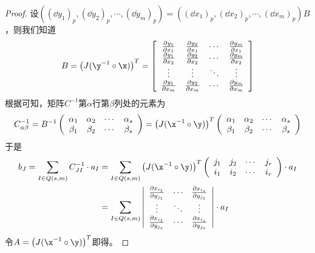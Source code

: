 \begin{proof}
	设$\left( (\dd y_{1})_{p},(\dd y_{2})_{p},\cdots,(\dd y_{m})_{p} \right)=\left( (\dd x_{1})_{p},(\dd x_{2})_{p},\cdots,(\dd x_{m})_{p} \right)B$，则我们知道
	\[
		B=\left( J(\y^{-1}\circ \x ) \right)^{T}=\left[ \begin{array}{cccc}{\frac { \partial y_{1} } { \partial x _ { 1 } } }  & {\frac { \partial y_{2} } { \partial x _ { 1 } } }  & \cdots & {\frac { \partial y_{m} } { \partial x _ { 1 } } }  \\ {\frac { \partial y_{1} } { \partial x _ { 2 } } }  & {\frac { \partial y_{2} } { \partial x _ { 2 } } }  & \cdots & {\frac { \partial y_{m} } { \partial x _ {2 } } }  \\ {\vdots}  & {\vdots } & {\ddots} & {\vdots}\\ {\frac { \partial y_{1} } { \partial x _ { m } } }  & {\frac { \partial y_{2} } { \partial x _ { m } } }  & \cdots & {\frac { \partial y_{m} } { \partial x _ { m } } }  \end{array}\right]
	\]
根据可知，矩阵$C^{-1}$第$\alpha$行第$\beta$列处的元素为
\[
	C^{-1}_{\alpha\beta}=B^{-1}\left(\begin{array}{cccc}\alpha_{1} & \alpha_{2} & \cdots & \alpha_{s} \\\beta_{1} & \beta_{2} & \cdots & \beta_{s}\end{array}\right)=\left( J(\x^{-1}\circ \y ) \right)^{T}\left(\begin{array}{cccc}\alpha_{1} & \alpha_{2} & \cdots & \alpha_{s} \\\beta_{1} & \beta_{2} & \cdots & \beta_{s}\end{array}\right)
\]
于是
\begin{equation}
\begin{split}
b_{J}=\sum_{I\in Q(s,m)}C^{-1}_{JI}\cdot a_{I}&=\sum_{I\in Q(s,m)}\left( J(\x^{-1}\circ \y ) \right)^{T}\left(\begin{array}{cccc} j_{1} & j_{2} & \cdots & j_{r} \\i_{1} & i_{2} & \cdots & i_{r}\end{array}\right)\cdot a_{I}\\
	&=\sum_{I\in Q(s,m)}
		\left| \begin{array}{ccc}{\frac { \partial x_{i_{1}} } { \partial y _ { j_{1} } } }  & {\cdots} & {\frac { \partial x_{i_{s}} } { \partial y _ { j_{1} } } }  \\ {\vdots}  & { \ddots} & {\vdots} \\ {\frac { \partial x_{i_{1}} } { \partial y _ { j_{s} } } }  & {\cdots} & {\frac { \partial x_{i_{s}} } { \partial y _ { j_{s} } } }\end{array}\right|\cdot a_{I}
\end{split}
\label{外形式丛的坐标转换}
\end{equation}
令$A=\left( J(\x^{-1}\circ \y ) \right)^{T} $即得。
\end{proof}

